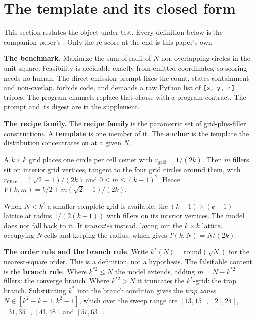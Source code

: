 \section{The template and its closed form}\label{sec:task}

This section restates the object under test. Every definition below is the companion paper's
\citep{companion}. Only the re-score at the end is this paper's own.

\textbf{The benchmark.} Maximize the sum of radii of $N$ non-overlapping circles in the unit
square. Feasibility is decidable exactly from emitted coordinates, so scoring needs no human.
The direct-emission prompt fixes the count, states containment and non-overlap, forbids
code, and demands a raw Python list of \texttt{[x, y, r]} triples. The program channels
replace that clause with a program contract. The prompt and its digest are in the
supplement.

\textbf{The recipe family.} The \textbf{recipe family} is the parametric set of
grid-plus-filler constructions. A \textbf{template} is one member of it. The \textbf{anchor}
is the template the distribution concentrates on at a given $N$.

A $k \times k$ grid places one circle per cell center with $r_{\mathrm{grid}} = 1/(2k)$. Then
$m$ fillers sit on interior grid vertices, tangent to the four grid circles around them,
with $r_{\mathrm{filler}} = (\sqrt{2} - 1)/(2k)$ and $0 \le m \le (k-1)^2$. Hence
$V(k, m) = k/2 + m(\sqrt{2} - 1)/(2k)$.

When $N < k^2$ a smaller complete grid is available, the $(k-1) \times (k-1)$ lattice at
radius $1/(2(k-1))$ with fillers on its interior vertices. The model does not fall back to
it. It \emph{truncates} instead, laying out the $k \times k$ lattice, occupying $N$ cells and
keeping the radius, which gives $T(k, N) = N/(2k)$.

\textbf{The order rule and the branch rule.} Write $k^*(N) = \mathrm{round}(\sqrt{N})$ for the
nearest-square order. This is a definition, not a hypothesis. The falsifiable content is the
\textbf{branch rule}. Where $k^{*2} \le N$ the model extends, adding $m = N - k^{*2}$ fillers:
the converge branch. Where $k^{*2} > N$ it truncates the $k^*$-grid: the trap branch.
Substituting $k^*$ into the branch condition gives the \emph{trap zones}
$N \in [k^2-k+1, k^2-1]$, which over the sweep range are $[13,15]$, $[21,24]$, $[31,35]$,
$[43,48]$ and $[57,63]$.

